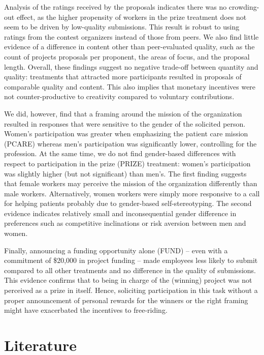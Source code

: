 \documentclass[11pt, titlepage]{article}
\begin{document}
Analysis of the ratings received by the proposals indicates there was no
crowding-out effect, as the higher propensity of workers in the prize
treatment does not seem to be driven by low-quality submissions. This
result is robust to using ratings from the contest organizers instead of
those from peers. We also find little evidence of a difference in
content other than peer-evaluated quality, such as the count of projects
proposals per proponent, the areas of focus, and the proposal length.
Overall, these findings suggest no negative trade-off between quantity
and quality: treatments that attracted more participants resulted in
proposals of comparable quality and content. This also implies that
monetary incentives were not counter-productive to creativity compared
to voluntary contributions.

We did, however, find that a framing around the mission of the
organization resulted in responses that were sensitive to the gender of
the solicited person. Women's participation was greater when emphasizing
the patient care mission (PCARE) whereas men's participation was
significantly lower, controlling for the profession. At the same time,
we do not find gender-based differences with respect to participation in
the prize (PRIZE) treatment: women's participation was slightly higher
(but not significant) than men's. The first finding suggests that female
workers may perceive the mission of the organization differently than
male workers. Alternatively, women workers were simply more responsive
to a call for helping patients probably due to gender-based
self-stereotyping. The second evidence indicates relatively small and
inconsequential gender difference in preferences such as competitive
inclinations or risk aversion between men and women.

Finally, announcing a funding opportunity alone (FUND) -- even with a
commitment of \$20,000 in project funding -- made employees less likely
to submit compared to all other treatments and no difference in the
quality of submissions. This evidence confirms that to being in charge
of the (winning) project was not perceived as a prize in itself. Hence,
soliciting participation in this task without a proper announcement of
personal rewards for the winners or the right framing might have
exacerbated the incentives to free-riding.

\section{Literature}\label{literature}
\end{document}
